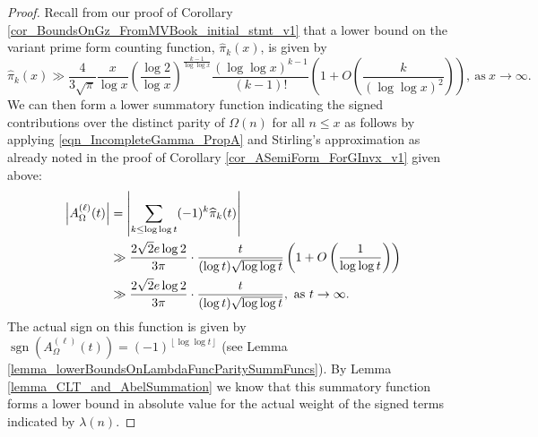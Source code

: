 \documentclass[11pt,reqno,a4letter]{article}
\numberwithin{figure}{section}
\numberwithin{table}{section}
\newcommand{\floor}[1]{\left\lfloor #1 \right\rfloor}
\theoremstyle{plain}
\numberwithin{theorem}{section}
\theoremstyle{definition}
\newcommand{\SuccSim}[0]{\overset{_{\scriptsize{\blacktriangle}}}{\succsim}}
\renewcommand{\SuccSim}[0]{\ensuremath{\gg}}
\begin{document}
\begin{proof} 
Recall from our proof of Corollary \ref{cor_BoundsOnGz_FromMVBook_initial_stmt_v1} that 
a lower bound on the variant prime form counting function, $\widehat{\pi}_k(x)$, is given by 
\[
\widehat{\pi}_k(x) \SuccSim \frac{4}{3\sqrt{\pi}} \frac{x}{\log x} \left(\frac{\log 2}{\log x}\right)^{ 
     \frac{k-1}{\log\log x}} \frac{(\log\log x)^{k-1}}{(k-1)!} \left( 
     1 + O\left(\frac{k}{(\log\log x)^2}\right) 
     \right), \mathrm{\ as\ } x \rightarrow \infty. 
\]
We can then form a lower summatory function indicating the signed contributions over the distinct 
parity of $\Omega(n)$ for all $n \leq x$ as follows by applying 
\eqref{eqn_IncompleteGamma_PropA} and Stirling's approximation as already noted in the 
proof of Corollary \ref{cor_ASemiForm_ForGInvx_v1} given above: 
\begin{align} 
\notag 
\left\lvert A_{\Omega}^{(\ell)}(t) \right\rvert & = 
     \left\lvert \sum_{k \leq \log\log t} (-1)^k \widehat{\pi}_k(t) \right\rvert \\ 
\notag 
     & \SuccSim  
     \frac{2\sqrt{2} e \log 2}{3\pi} \cdot 
     \frac{t}{(\log t) \sqrt{\log\log t}} \left( 
     1 + O\left(\frac{1}{\log\log t}\right) 
     \right) \\ 
\label{proof_thm_GInvFunc_v0} 
     & \gg \frac{2\sqrt{2} e \log 2}{3\pi} \cdot 
     \frac{t}{(\log t) \sqrt{\log\log t}}, 
     \mathrm{\ as\ } t \rightarrow \infty. 
\end{align} 
The actual sign on this function is given by 
$\operatorname{sgn}(A_{\Omega}^{(\ell)}(t)) = (-1)^{\floor{\log\log t}}$ 
(see Lemma \ref{lemma_lowerBoundsOnLambdaFuncParitySummFuncs}). 
By Lemma \ref{lemma_CLT_and_AbelSummation}
we know that this summatory function forms a lower bound in absolute value for the 
actual weight of the signed terms indicated by $\lambda(n)$. 


\end{proof}
\end{document}
